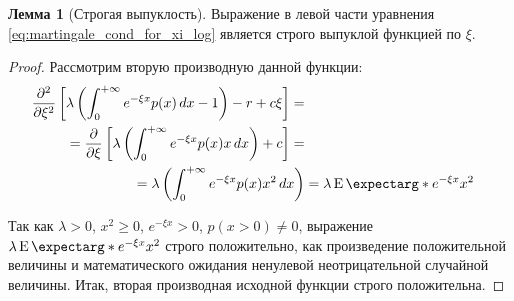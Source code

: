 \documentclass[a4paper,12pt]{article}
\theoremstyle{definition}
\newtheorem{lemma}{Лемма}
\newcommand{\expect}{\operatorname{E}\expectarg}
\begin{document}
\begin{lemma}[Строгая выпуклость]\label{thm:strict_convexity_m1}
Выражение в левой части уравнения \eqref{eq:martingale_cond_for_xi_log} является строго выпуклой функцией по $\xi$.
\end{lemma}
\begin{proof}
Рассмотрим вторую производную данной функции:
\begin{equation*}
\begin{split}
     \pdv[2]{}{\xi} \left[\lambda \left(\int_{0}^{+\infty} e^{-\xi x} p(x) \,dx - 1\right) - r + c\xi \right] =\\
     = \pdv{}{\xi} \left[\lambda \left(\int_{0}^{+\infty} e^{-\xi x} p(x) x \,dx \right) + c \right] =\\
     = \lambda \left(\int_{0}^{+\infty} e^{-\xi x} p(x) x^{2} \,dx \right) &= \lambda \expect*{e^{-\xi x} x^2}
\end{split}
\end{equation*}

Так как $\lambda > 0$, $x^2 \ge 0$, $e^{-\xi x} > 0$, $p(x > 0) \neq 0$, выражение $\lambda \expect*{e^{-\xi x} x^2}$ строго положительно, как произведение положительной величины и математического ожидания ненулевой неотрицательной случайной величины. Итак, вторая производная исходной функции строго положительна.

\end{proof}
\end{document}
